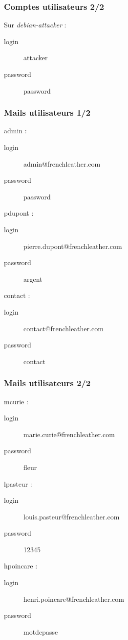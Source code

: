 \documentclass{beamer}
\begin{document}
		\begin{frame}
			\frametitle{Comptes utilisateurs 2/2}
			\begin{alertblock}{Sur \textit{debian-attacker} :}
				\begin{description}
					\item[login] attacker
					\item[password] password
				\end{description}
			\end{alertblock}
		\end{frame}
		\begin{frame}
			\frametitle{Mails utilisateurs 1/2}
			\begin{alertblock}{admin :}
				\begin{description}
					\item[login] admin@frenchleather.com
					\item[password] password
				\end{description}
			\end{alertblock}
			\begin{alertblock}{pdupont :}
				\begin{description}
					\item[login] pierre.dupont@frenchleather.com
					\item[password] argent
				\end{description}
			\end{alertblock}
			\begin{alertblock}{contact :}
				\begin{description}
					\item[login] contact@frenchleather.com
					\item[password] contact
				\end{description}
			\end{alertblock}
		\end{frame}
		\begin{frame}
			\frametitle{Mails utilisateurs 2/2}
			\begin{alertblock}{mcurie :}
				\begin{description}
					\item[login] marie.curie@frenchleather.com
					\item[password] fleur
				\end{description}
			\end{alertblock}
			\begin{alertblock}{lpasteur :}
				\begin{description}
					\item[login] louis.pasteur@frenchleather.com
					\item[password] 12345
				\end{description}
			\end{alertblock}
			\begin{alertblock}{hpoincare :}
				\begin{description}
					\item[login] henri.poincare@frenchleather.com
					\item[password] motdepasse
				\end{description}
			\end{alertblock}
		\end{frame}
\end{document}
